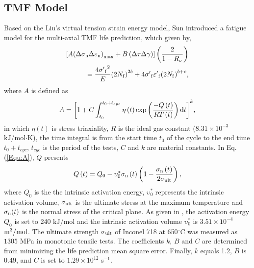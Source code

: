 \documentclass[preprint,5p,twocolumn,11pt,sort&compress]{elsarticle}
\begin{document}
\subsection{TMF Model}
Based on the Liu's virtual tension strain energy model, Sun \cite{SUN2019228} introduced a fatigue model for the multi-axial TMF life prediction, which given by,
\begin{equation}
\begin{aligned}
\left[ {A{{\left( {\Delta {\sigma _{\rm n}}\Delta {\varepsilon _{\rm n}}} \right)}_{\max }} + B\left( {\Delta \tau \Delta \gamma } \right)} \right]\left( {\frac{2}{{1 - {R_\sigma }}}} \right)\\
= \frac{{4{{\sigma '}_{\rm f}}^2}}{E}{\left( {2{N_{\rm f}}} \right)^{2b}} + 4{{\sigma '}_{\rm f}}{{\varepsilon '}_{\rm f}}{\left( {2{N_{\rm f}}} \right)^{b + c}},
\end{aligned}
\label{Equ:TMF_model}
\end{equation}
where $A$ is defined as
\begin{equation}
A = {\left[ {1 + C\int_{{t_0}}^{{t_0} + {t_{cyc}}} {\eta \left( t \right)\exp \left( {\frac{{ - Q\left( t \right)}}{{RT\left( t \right)}}} \right){\rm{d}}t} } \right]^k},
\label{Equ:A}
\end{equation}
in which $\eta \left( t \right)$ is stress triaxiality, $R$ is the ideal gas constant ($8.31\times10^{-3}$ kJ/mol$\cdot$K), the time integral is from the start time $t_0$ of the cycle to the end time $t_0 + t_{cyc}$, $t_{cyc}$ is the period of the tests, $C$ and $k$ are material constants.
In Eq. (\ref{Equ:A}), $Q$ presents \cite{Warren2006,Warren2008}
\begin{equation}
Q\left( t \right) = {Q_0} - \upsilon _0^*{\sigma _{\rm n}}\left( t \right)\left( {1 - \frac{{{\sigma _{\rm n}}\left( t \right)}}{{2{\sigma _{\rm ult}}}}} \right),
\label{Equ:creep_activation_energy}
\end{equation}
where $Q_0$ is the the intrinsic activation energy, $\upsilon _0^*$ represents the intrinsic activation volume, $\sigma_{\rm ult}$ is the ultimate stress at the maximum temperature and $\sigma_{\rm n}(t)$ is the normal stress of the critical plane.
As given in \cite{Warren2008}, the activation energy $Q_0$ is set to 240 kJ/mol and the intrinsic activation volume $\upsilon _0^*$ is $3.51\times10^{-4}$ $\rm{m}^{3}/\rm{mol}$. The ultimate strength $\sigma_{\rm ult}$ of Inconel 718 at 650$^\circ$C was measured as $1305$ MPa in monotonic tensile tests. The coefficients $k$, $B$ and $C$ are determined from minimizing the life prediction mean square error. Finally, $k$ equals 1.2, $B$ is 0.49, and $C$ is set to $1.29\times10^{12}$ s$^{-1}$.
\end{document}
